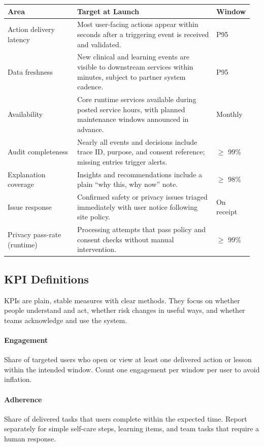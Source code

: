\documentclass[12pt]{article}
\begin{document}
\begin{longtable}{@{}p{0.28\linewidth}p{0.56\linewidth}p{0.12\linewidth}@{}}
\toprule
\textbf{Area} & \textbf{Target at Launch} & \textbf{Window} \\
\midrule
\endhead
Action delivery latency & Most user-facing actions appear within seconds after a triggering event is received and validated. & P95 \\
Data freshness & New clinical and learning events are visible to downstream services within minutes, subject to partner system cadence. & P95 \\
Availability & Core runtime services available during posted service hours, with planned maintenance windows announced in advance. & Monthly \\
Audit completeness & Nearly all events and decisions include trace ID, purpose, and consent reference; missing entries trigger alerts. & \(\geq\) 99\% \\
Explanation coverage & Insights and recommendations include a plain “why this, why now” note. & \(\geq\) 98\% \\
Issue response & Confirmed safety or privacy issues triaged immediately with user notice following site policy. & On receipt \\
Privacy pass-rate (runtime) & Processing attempts that pass policy and consent checks without manual intervention. & \(\geq\) 99\% \\
\bottomrule
\end{longtable}

\subsection*{KPI Definitions}
KPIs are plain, stable measures with clear methods. They focus on whether people understand and act, whether risk changes in useful ways, and whether teams acknowledge and use the system.

\paragraph{Engagement}
Share of targeted users who open or view at least one delivered action or lesson within the intended window. Count one engagement per window per user to avoid inflation.

\paragraph{Adherence}
Share of delivered tasks that users complete within the expected time. Report separately for simple self-care steps, learning items, and team tasks that require a human response.
\end{document}
